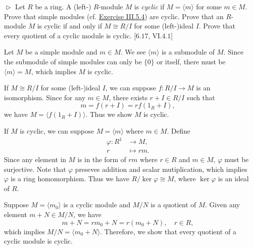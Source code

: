 \documentclass[12pt,letterpaper,boxed]{hmcpset}
\begin{document}
\hypertarget{Exercise III.6.16}{}
\begin{problem}[6.16]
	$\vartriangleright$ Let $R$ be a ring. A (left-) $R$-module $M$ is \emph{cyclic} if $M=\langle m\rangle$ for some $m \in M .$ Prove that simple modules (cf. \hyperlink{Exercise III.5.4}{Exercise III.5.4}) are cyclic. Prove that an $R$-module $M$ is cyclic if and only if $M \cong R / I$ for some (left-)ideal $I$. Prove that every quotient of a cyclic module is cyclic. $[6.17$, \textsection $\mathrm{VI}.4.1]$
\end{problem}
\begin{solution}
	Let $M$ be a simple module and $m\in M$. We see $\langle m\rangle$ is a submodule of $M$. Since the submodule of simple modules can only be $\{0\}$ or itself, there must be $\langle m\rangle=M$, which implies $M$ is cyclic.
	
	If $M \cong R / I$ for some (left-)ideal $I$, we can suppose $f:R / I\to M$ is an isomorphism. Since for any $m\in M$, there exists $r+I\in R/I$ such that
	\[
	m=f(r+I)=rf(1_R+I),
	\]
	we have $M=\langle f(1_R+I)\rangle$. Thus we show $M$ is cyclic.
	
	If $M$ is cyclic, we can suppose $M=\langle m\rangle$ where $m\in M$. Define
	\begin{align*}
		\varphi:R^1 &\longrightarrow M ,\\
		r&\longmapsto rm.
	\end{align*}
	Since any element in $M$ is in the form of $rm$ where $r\in R$ and $m\in M$, $\varphi$ must be surjective. Note that $\varphi$ preseves addition and scalar mutiplication, which implies $\varphi$ is a ring homomorphism. Thus we have $R/\ker\varphi\cong M$, where $\ker\varphi$ is an ideal of $R$.
	
	Suppose $M=\langle m_0\rangle$ is a cyclic module and $M/N$ is a quotient of $M$. Given any element $m+N \in M/N$, we have
	\[
	m+N=rm_0+N=r(m_0+N),\quad r\in R,
	\]
	which implies $M/N=\langle m_0+N\rangle$. Therefore, we show that every quotient of a cyclic module is cyclic.

\end{solution}
\end{document}
